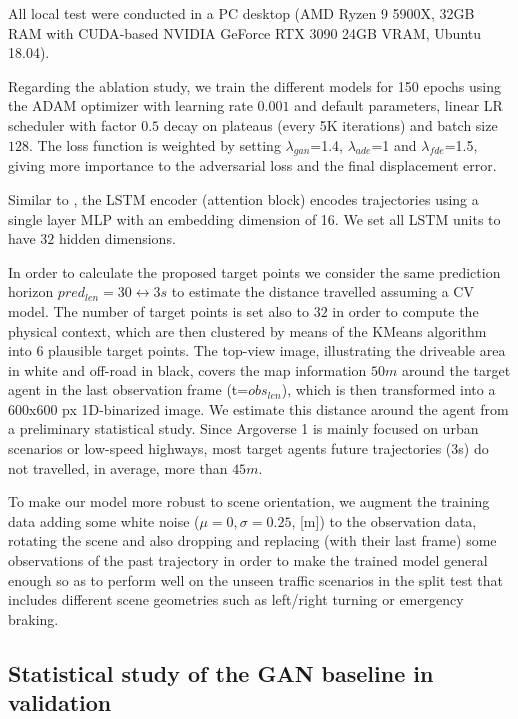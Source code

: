 All local test were conducted in a PC desktop (AMD Ryzen 9 5900X, 32GB RAM with \ac{CUDA}-based NVIDIA GeForce RTX 3090 24GB VRAM, Ubuntu 18.04).

Regarding the ablation study, we train the different models for 150 epochs using the \ac{ADAM} optimizer with learning rate $0.001$ and default parameters, linear \ac{LR} scheduler with factor $0.5$ decay on plateaus (every 5K iterations) and batch size $128$. The loss function is weighted by setting $\lambda_{gan}$=1.4, $\lambda_{ade}$=1 and $\lambda_{fde}$=1.5, giving more importance to the adversarial loss and the final displacement error. 

Similar to \cite{sadeghian2019sophie}, the \ac{LSTM} encoder (attention block) encodes trajectories using a single layer \ac{MLP} with an embedding dimension of 16. We set all \ac{LSTM} units to have $32$ hidden dimensions. 

In order to calculate the proposed target points we consider the same prediction horizon $pred_{len}=30 \longleftrightarrow 3s$ to estimate the distance travelled assuming a \ac{CV} model. The number of target points is set also to $32$ in order to compute the physical context, which are then clustered by means of the KMeans algorithm into $6$ plausible target points. The top-view image, illustrating the driveable area in white and off-road in black, covers the map information $50m$ around the target agent in the last observation frame (t=$obs_{len}$), which is then transformed into a 600x600 px 1D-binarized image. We estimate this distance around the agent from a preliminary statistical study. Since Argoverse 1 is mainly focused on urban scenarios or low-speed highways, most target agents future trajectories (3s) do not travelled, in average, more than $45m$.  

To make our model more robust to scene orientation, we augment the training data adding some white noise ($\mu=0, \sigma=0.25$, [m]) to the observation data, rotating the scene and also dropping and replacing (with their last frame) some observations of the past trajectory in order to make the trained model general enough so as to perform well on the unseen traffic scenarios in the split test that includes different scene geometries such as left/right turning or emergency braking.%

\subsection{Statistical study of the GAN baseline in validation}
\label{subsec:5_target_agent_distribution}

